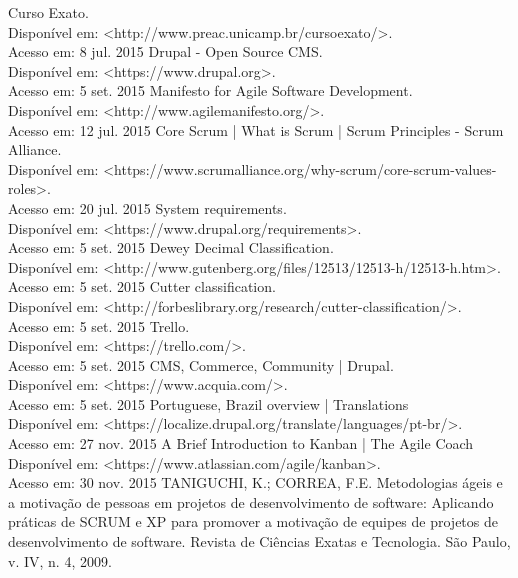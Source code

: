 \documentclass[a4paper]{article}
\begin{document}
\pagebreak
\begin{thebibliography}{9}
 Curso Exato.\\Disponível em: <http://www.preac.unicamp.br/cursoexato/>.\\Acesso em: 8 jul. 2015
 Drupal - Open Source CMS.\\Disponível em: <https://www.drupal.org>.\\Acesso em: 5 set. 2015
 Manifesto for Agile Software Development.\\Disponível em: <http://www.agilemanifesto.org/>.\\Acesso em: 12 jul. 2015
 Core Scrum | What is Scrum | Scrum Principles - Scrum Alliance.\\ Disponível em: <https://www.scrumalliance.org/why-scrum/core-scrum-values-roles>. \\Acesso em: 20 jul. 2015
 System requirements.\\Disponível em: <https://www.drupal.org/requirements>.\\Acesso em: 5 set. 2015
 Dewey Decimal Classification.\\Disponível em: <http://www.gutenberg.org/files/12513/12513-h/12513-h.htm>.\\Acesso em: 5 set. 2015
 Cutter classification.\\Disponível em: <http://forbeslibrary.org/research/cutter-classification/>.\\Acesso em: 5 set. 2015
 Trello.\\Disponível em: <https://trello.com/>.\\Acesso em: 5 set. 2015
 CMS, Commerce, Community | Drupal.\\Disponível em: <https://www.acquia.com/>.\\Acesso em: 5 set. 2015
 Portuguese, Brazil overview | Translations\\Disponível em: <https://localize.drupal.org/translate/languages/pt-br/>.\\Acesso em: 27 nov. 2015
 A Brief Introduction to Kanban | The Agile Coach\\Disponível em: <https://www.atlassian.com/agile/kanban>.\\Acesso em: 30 nov. 2015
 TANIGUCHI, K.; CORREA, F.E. Metodologias ágeis e a motivação de pessoas em projetos de desenvolvimento de software: Aplicando práticas de SCRUM e XP para promover a motivação de equipes de projetos de desenvolvimento de software. Revista de Ciências Exatas e Tecnologia. São Paulo, v. IV, n. 4, 2009.

\end{thebibliography}
\end{document}
